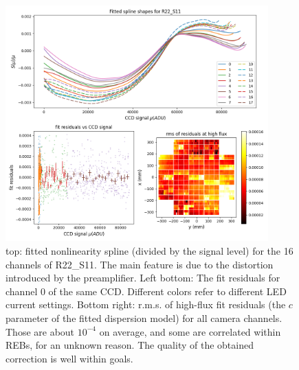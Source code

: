 \begin{figure}[ht]
\begin{centering}
\includegraphics[width=0.9\textwidth]{figures/nonlin_plots.png}
\end{centering}
\caption{top: fitted nonlinearity spline (divided by the signal level) for the 16 channels of R22\_S11. The main feature is due to the distortion introduced by the preamplifier. Left bottom: The fit residuals for channel 0 of the same CCD. Different colors refer to different LED current settings. Bottom right: r.m.s. of high-flux fit residuals (the $c$ parameter of the fitted dispersion model) for all camera channels. Those are about $10^{-4}$ on average, and some are correlated within REBs, for an unknown reason. The quality of the obtained correction is well within goals.\label{fig:nonlin_model}}

\end{figure}



